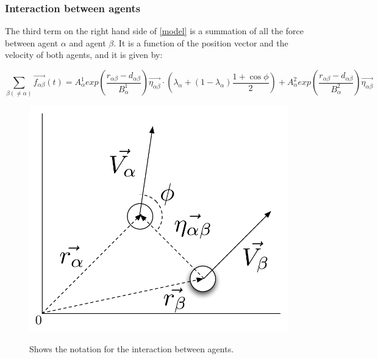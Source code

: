 \subsubsection{Interaction between agents}
The third term on the right hand side of \eqref{model} is a summation of all the 
force between agent $\alpha$ and agent $\beta$. It is a function of the position vector and the velocity of 
both agents, and it is given by:

\begin{equation}
    \sum_{\beta \left( \neq \alpha \right)}
        \vec{f_{\alpha \beta }}\left( t \right) =
        A_{\alpha}^{1} exp \left(
            \frac{ r_{\alpha \beta} - d_{\alpha \beta }}
                 {B_{\alpha}^1}
        \right)
    \vec{\eta_{\alpha \beta}} \cdot
    \left(
        \lambda_{\alpha} + \left(
            1 - \lambda_{\alpha}
        \right)
		\frac{1+\cos{\phi}}{2}
    \right) +
    A_{\alpha}^{2} exp\left(
        \frac{r_{\alpha \beta} - d_{\alpha \beta}}
             {B_{\alpha}^{2}}
    \right)
    \vec{\eta_{\alpha \beta}}
    \label{agentinteraction}
\end{equation}

\begin{figure}[ht]
    \centering
    {\includegraphics[scale=0.35]{Figures/NotationOfInteraction.pdf}} 
    \caption{Shows the notation for the interaction between agents.}
    \label{NotationOfInteraction}
\end{figure}

